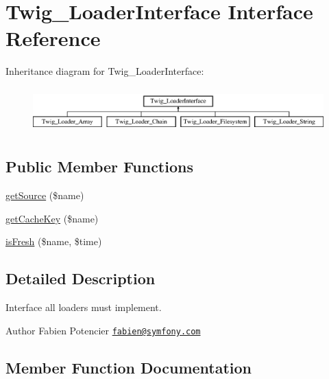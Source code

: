 \hypertarget{interfaceTwig__LoaderInterface}{}\section{Twig\+\_\+\+Loader\+Interface Interface Reference}
\label{interfaceTwig__LoaderInterface}
Inheritance diagram for Twig\+\_\+\+Loader\+Interface\+:\begin{figure}[H]
\begin{center}
\leavevmode
\includegraphics[height=1.761006cm]{interfaceTwig__LoaderInterface}
\end{center}
\end{figure}
\subsection*{Public Member Functions}
\begin{DoxyCompactItemize}
\item 
\hyperlink{interfaceTwig__LoaderInterface_a8a7e7a9d2a44e12db931d9321e61713c}{get\+Source} (\$name)
\item 
\hyperlink{interfaceTwig__LoaderInterface_a0c254445d05885ae35272575ab83370a}{get\+Cache\+Key} (\$name)
\item 
\hyperlink{interfaceTwig__LoaderInterface_a072d6f33f65cd576d37df05041ad5eba}{is\+Fresh} (\$name, \$time)
\end{DoxyCompactItemize}


\subsection{Detailed Description}
Interface all loaders must implement.

\begin{DoxyAuthor}{Author}
Fabien Potencier \href{mailto:fabien@symfony.com}{\tt fabien@symfony.\+com} 
\end{DoxyAuthor}


\subsection{Member Function Documentation}
